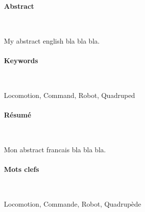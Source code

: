 \newpage

\noindent\makebox[\linewidth]{\rule{0.6\textwidth}{2pt}}

\small

\paragraph{Abstract}~

My abstract english bla bla bla.


\paragraph{Keywords}~

Locomotion, Command, Robot, Quadruped

\noindent\makebox[\linewidth]{\rule{0.6\textwidth}{2pt}}



\newpage


\noindent\makebox[\linewidth]{\rule{0.6\textwidth}{2pt}}


\paragraph{Résumé}~

Mon abstract francais bla bla bla.


\paragraph{Mots clefs} ~

Locomotion, Commande, Robot, Quadrupède


\noindent\makebox[\linewidth]{\rule{0.6\textwidth}{2pt}}

\normalsize